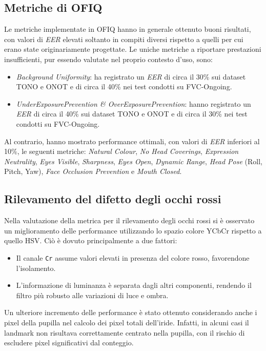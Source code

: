 \documentclass[12pt,a4paper,openright,twoside]{book}
\begin{document}
\subsection{Metriche di OFIQ}
Le metriche implementate in OFIQ hanno in generale ottenuto buoni risultati, con valori di \textit{EER} elevati soltanto in compiti diversi rispetto a quelli per cui erano state originariamente progettate. Le uniche metriche a riportare prestazioni insufficienti, pur essendo valutate nel proprio contesto d'uso, sono: \begin{itemize}
    \item \textit{Background Uniformity}: ha registrato un \textit{EER} di circa il 30\% sui dataset TONO e ONOT e di circa il 40\% nei test condotti su FVC-Ongoing.
    \item \textit{UnderExposurePrevention \& OverExposurePrevention}: hanno registrato un \textit{EER} di circa il 40\% sui dataset TONO e ONOT e di circa il 30\% nei test condotti su FVC-Ongoing.
\end{itemize}

Al contrario, hanno mostrato performance ottimali, con valori di \textit{EER} inferiori al 10\%, le seguenti metriche: \textit{Natural Colour}, \textit{No Head Coverings}, \textit{Expression Neutrality}, \textit{Eyes Visible}, \textit{Sharpness}, \textit{Eyes Open}, \textit{Dynamic Range}, \textit{Head Pose} (Roll, Pitch, Yaw), \textit{Face Occlusion Prevention} e \textit{Mouth Closed}.

\subsection{Rilevamento del difetto degli occhi rossi}
Nella valutazione della metrica per il rilevamento degli occhi rossi si è osservato un miglioramento delle performance utilizzando lo spazio colore YCbCr rispetto a quello HSV.  
Ciò è dovuto principalmente a due fattori:
\begin{itemize}
    \item Il canale \texttt{Cr} assume valori elevati in presenza del colore rosso, favorendone l'isolamento.
    \item L'informazione di luminanza è separata dagli altri componenti, rendendo il filtro più robusto alle variazioni di luce e ombra.
\end{itemize}

Un ulteriore incremento delle performance è stato ottenuto considerando anche i pixel della pupilla nel calcolo dei pixel totali dell'iride. Infatti, in alcuni casi il landmark non risultava correttamente centrato nella pupilla, con il rischio di escludere pixel significativi dal conteggio.
\end{document}
